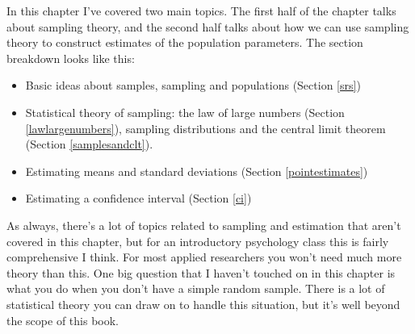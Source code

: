 \documentclass[spanish,]{book}
\providecommand{\tightlist}{%
  \setlength{\itemsep}{0pt}\setlength{\parskip}{0pt}}
\begin{document}
In this chapter I've covered two main topics. The first half of the
chapter talks about sampling theory, and the second half talks about how
we can use sampling theory to construct estimates of the population
parameters. The section breakdown looks like this:

\begin{itemize}
\tightlist
\item
  Basic ideas about samples, sampling and populations (Section
  \ref{srs})
\item
  Statistical theory of sampling: the law of large numbers (Section
  \ref{lawlargenumbers}), sampling distributions and the central limit
  theorem (Section \ref{samplesandclt}).
\item
  Estimating means and standard deviations (Section
  \ref{pointestimates})
\item
  Estimating a confidence interval (Section \ref{ci})
\end{itemize}

As always, there's a lot of topics related to sampling and estimation
that aren't covered in this chapter, but for an introductory psychology
class this is fairly comprehensive I think. For most applied researchers
you won't need much more theory than this. One big question that I
haven't touched on in this chapter is what you do when you don't have a
simple random sample. There is a lot of statistical theory you can draw
on to handle this situation, but it's well beyond the scope of this
book.


\end{document}
